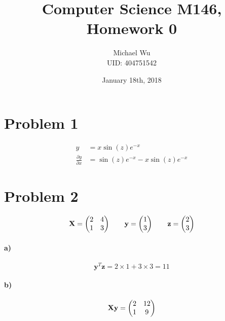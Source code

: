\documentclass[12pt]{article}
\begin{document}
\title{Computer Science M146, Homework 0}
\date{January 18th, 2018}
\author{Michael Wu\\UID: 404751542}
\maketitle

\section*{Problem 1}

\begin{align*}
        y&=x\sin(z)e^{-x}\\
        \frac{\partial y}{\partial x}&=\sin(z)e^{-x}-x\sin(z)e^{-x}
\end{align*}

\section*{Problem 2}

\[\mathbf{X}=\left(
        \begin{array}{@{}cc@{}}
                2&4\\
                1&3
        \end{array}
\right)\qquad
\mathbf{y}=\left(
        \begin{array}{@{}c@{}}
                1\\
                3
        \end{array}
\right)\qquad
\mathbf{z}=\left(
        \begin{array}{@{}c@{}}
                2\\
                3
        \end{array}
\right)
\]

\paragraph{a)}

\[\mathbf{y}^T\mathbf{z}=2\times 1+ 3\times 3 = 11\]

\paragraph{b)}

\[\mathbf{X}\mathbf{y}=\left(
        \begin{array}{@{}cc@{}}
                2&12\\
                1&9
        \end{array}
\right)\]
\end{document}
